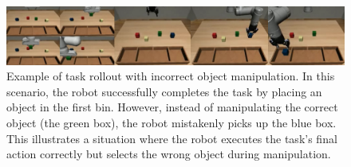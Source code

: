 \begin{figure}[t]
    \centering
    \includegraphics[width=1.0\textwidth]{figures/images/baseline_pick_place_error/pick_place_trj.jpg}
    \caption{Example of task rollout with incorrect object manipulation. In this scenario, the robot successfully completes the task by placing an object in the first bin. However, instead of manipulating the correct object (the green box), the robot mistakenly picks up the blue box. This illustrates a situation where the robot executes the task's final action correctly but selects the wrong object during manipulation.}
    \label{fig:baseline_pick_place_error}
\end{figure}
